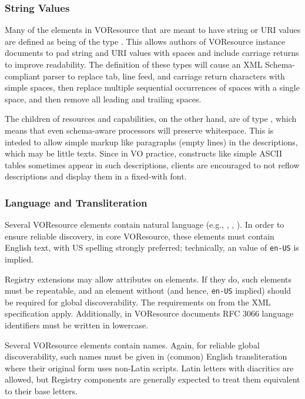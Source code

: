 \documentclass[11pt,a4paper]{ivoa}
\begin{document}
\subsubsection{String Values}

Many of the elements in VOResource that are meant to have string or
URI values are defined as being of the type .
This allows authors of VOResource instance documents to pad string and
URI values with spaces and include carriage returns to improve
readability.  The definition of these types will cause an XML
Schema-compliant parser to replace tab, line feed, and carriage return
characters with simple spaces, then replace multiple sequential
occurrences of spaces with a single space, and then remove all leading
and trailing spaces.

The  children of resources and capabilities, on the
other hand, are of type , which means that even
schema-aware processors will preserve whitespace.  This is inteded to
allow simple markup like paragraphs (empty lines) in the descriptions,
which may be little texts.  Since in VO practice, constructs like simple
ASCII tables sometimes appear in such descriptions, clients are
encouraged to not reflow descriptions and display them in a fixed-with
font.

\subsubsection{Language and Transliteration}

Several VOResource elements contain natural language (e.g.,
, , ).  In order to
ensure reliable discovery, in core VOResource, these elements must
contain English text, with US spelling strongly preferred; technically,
an  value of \texttt{en-US} is implied.

Registry extensions may allow  attributes on elements.
If they do, such elements must be repeatable, and an element without
 (and hence, \texttt{en-US} implied) should be required
for global discoverability.  The requirements on  from
the XML specification \citep{std:XML} apply.  Additionally, in
VOResource documents RFC 3066 language identifiers must be written in
lowercase.

Several VOResource elements contain names.  Again, for reliable global
discoverability, such names must be given in (common) English
transliteration where their original form uses non-Latin scripts.
Latin letters with diacritics are allowed, but Registry components are
generally expected to treat them equivalent to their base letters.
\end{document}
